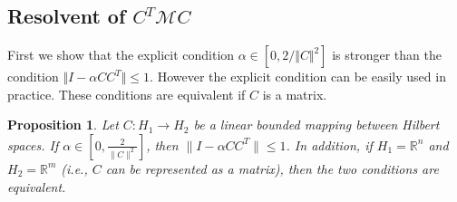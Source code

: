 \documentclass[11pt]{article}
\def\baqn{\begin{eqnarray*}}
\def\eaqn{\end{eqnarray*}}
\theoremstyle{plain}
\newtheorem{lemma}[theorem]{Lemma}
\newtheorem{proposition}[theorem]{Proposition}
\newcommand{\tcb}{\textcolor{blue}}
\newcommand{\R}{{\mathbb R}}
\begin{document}
{\subsection{Resolvent of $C^T\mathcal{M}C$}
First we  show that the explicit condition $\alpha\in [0,2/\Vert C \Vert^2]$ is stronger than the condition $\Vert I-\alpha CC^T \Vert \le 1$. However the explicit condition can be easily used in practice. These conditions are equivalent if $C$ is a matrix.
%
%
{
\begin{proposition}\label{lem1}
Let $C: H_1 \to H_2$ be a linear bounded mapping between Hilbert spaces. If $\alpha \in \left[0, \frac{2}{\|C\|^2}\right]$, then $\|I - \alpha CC^T\| \leq 1$. In addition, if $H_1=\R^n$ and $H_2=\R^m$ (i.e., $C$ can be represented as a matrix), then the two conditions are equivalent.

\end{proposition}}}
\end{document}
